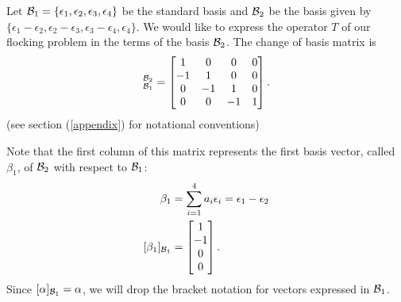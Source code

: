 \documentclass{homework}
\begin{document}
\begin{letterenum}
        \item 
            Let $\mathcal{B}_1 = \{\epsilon_1, \epsilon_2, \epsilon_3, \epsilon_4\}$ be the standard basis
            and $\mathcal{B}_2$ be the basis given by
            $\{\epsilon_1 - \epsilon_2, \epsilon_2 - \epsilon_3,
                \epsilon_3 - \epsilon_4, \epsilon_4\}$.
            We would like to express the operator
            $T$ of our flocking problem in the terms of the basis $\mathcal{B}_2$.
            The change of basis matrix  is
            \begin{equation}
                [P]_{\basis_1}^{\basis_2} = \begin{bmatrix}
                    1 & 0 & 0 & 0 \\
                    -1 & 1 & 0 & 0 \\
                    0 & -1 & 1 & 0 \\
                    0 & 0 & -1 & 1 \\
                \end{bmatrix}.
                \label{eq:basis-1-to-basis-2}
            \end{equation}
            (see section (\ref{appendix}) for notational conventions)

            Note that the first column of this matrix represents the first
            basis vector, called $\beta_1$, of $\mathcal{B}_2$ with respect to $\mathcal{B}_1$:
            \begin{align}
                \beta_1 &= \sum_{i=1}^{4} a_i \epsilon_i = \epsilon_1 - \epsilon_2 \\
                [\beta_1]_{\mathcal{B}_1} &= \begin{bmatrix}
                    1 \\ -1 \\ 0 \\ 0
                \end{bmatrix}.
            \end{align}
            Since $[\alpha]_{\mathcal{B}_1} = \alpha$, we will drop the bracket
            notation for vectors expressed in $\mathcal{B}_1$.


\end{letterenum}
\end{document}
